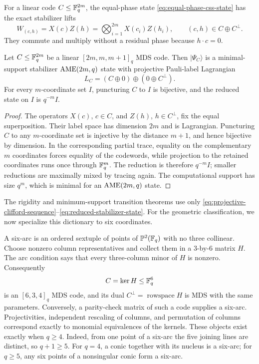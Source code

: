 For a linear code \(C\leq\mathbb F_q^{2m}\), the equal-phase state
\eqref{eq:equal-phase-css-state} has the exact stabilizer lifts
\[
 W_{(c,h)}=X(c)Z(h)=\bigotimes_{i=1}^{2m}X(c_i)Z(h_i),
 \qquad(c,h)\in C\oplus C^\perp .
\]
They commute and multiply without a residual phase because
\(h\mathbin\cdot c=0\).

\begin{proposition}
\label{prop:mds-css-ame-dictionary}
Let \(C\leq\mathbb F_q^{2m}\) be a linear \([2m,m,m+1]_q\) MDS code.  Then
\(\lvert\Psi_C\rangle\) is a minimal-support stabilizer
\(\mathrm{AME}(2m,q)\) state with projective Pauli-label Lagrangian
\[
 L_C=(C\oplus0)\oplus(0\oplus C^\perp).
\]
For every \(m\)-coordinate set \(I\), puncturing \(C\) to \(I\) is
bijective, and the reduced state on \(I\) is \(q^{-m}I\).
\end{proposition}

\begin{proof}
The operators \(X(c)\), \(c\in C\), and \(Z(h)\), \(h\in C^\perp\),
fix the equal superposition.  Their label space has dimension \(2m\) and is
Lagrangian.  Puncturing \(C\) to any \(m\)-coordinate set is injective by
the distance \(m+1\), and hence bijective by dimension.  In the corresponding
partial trace, equality on the complementary \(m\) coordinates forces
equality of the codewords, while projection to the retained coordinates runs
once through \(\mathbb F_q^m\).  The reduction is therefore \(q^{-m}I\); smaller
reductions are maximally mixed by tracing again.  The computational support
has size \(q^m\), which is minimal for an \(\mathrm{AME}(2m,q)\) state.
\end{proof}

The rigidity and minimum-support transition theorems use only
\eqref{eq:projective-clifford-sequence}--\eqref{eq:reduced-stabilizer-state}.
For the geometric classification, we now specialize this dictionary to six
coordinates.

A six-arc is an ordered sextuple of points of \(\mathbb P^2(\mathbb F_q)\) with no
three collinear.  Choose nonzero column representatives and collect them
in a \(3\)-by-\(6\) matrix \(H\).  The arc condition says that every
three-column minor of \(H\) is nonzero.  Consequently
\[
 C=\ker H\leq\mathbb F_q^6
\]
is an \([6,3,4]_q\) MDS code, and its dual
\(C^\perp=\operatorname{rowspace}H\) is MDS with the same parameters.
Conversely, a parity-check matrix of such a code supplies a six-arc.
Projectivities, independent rescaling of columns, and permutation of
columns correspond exactly to monomial equivalences of the kernels.
These objects exist exactly when \(q\geq4\).  Indeed, from one point of
a six-arc the five joining lines are distinct, so \(q+1\geq5\).  For
\(q=4\), a conic together with its nucleus is a six-arc; for \(q\geq5\),
any six points of a nonsingular conic form a six-arc.


